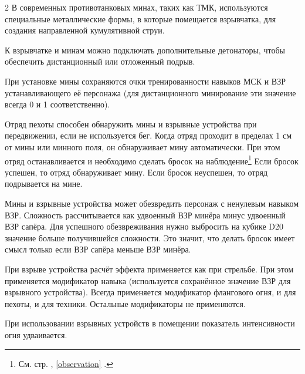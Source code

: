\documentclass[twoside]{article}
\begin{document}
\begin{multicols}{2}
В современных противотанковых минах, таких как ТМК, используются
специальные металлические формы, в которые помещается взрывчатка, для
создания направленной кумулятивной струи.

К взрывчатке и минам можно подключать дополнительные детонаторы, чтобы
обеспечить дистанционный или отложенный подрыв.

При установке мины сохраняются очки тренированности навыков МСК и ВЗР
устанавливающего её персонажа (для дистанционного минирование эти
значение всегда 0 и 1 соответственно).

Отряд пехоты способен обнаружить мины и взрывные устройства при
передвижении, если не используется бег. Когда отряд проходит в пределах
1 см от мины или минного поля, он обнаруживает мину автоматически. При
этом отряд останавливается и необходимо сделать бросок на
наблюдение\footnote{См. стр. \pageref{observation}, \ref{observation} .} Если бросок успешен, то отряд обнаруживает мину.
Если бросок неуспешен, то отряд подрывается на мине.

Мины и взрывные устройства может обезвредить персонаж с ненулевым
навыком ВЗР. Сложность рассчитывается как удвоенный ВЗР минёра минус
удвоенный ВЗР сапёра. Для успешного обезвреживания нужно выбросить на
кубике D20 значение больше получившейся сложности. Это значит, что
делать бросок имеет смысл только если ВЗР сапёра меньше ВЗР минёра.

При взрыве устройства расчёт эффекта применяется как при стрельбе. При
этом применяется модификатор навыка (используется сохранённое значение
ВЗР для взрывного устройства). Всегда применяется модификатор флангового
огня, и для пехоты, и для техники. Остальные модификаторы не
применяются.

При использовании взрывных устройств в помещении показатель
интенсивности огня удваивается.


\end{multicols}
\end{document}
